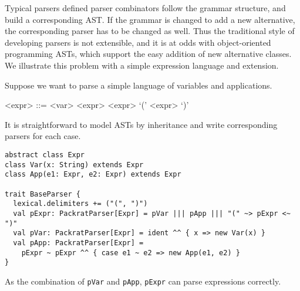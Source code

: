 
Typical parsers defined parser combinators follow the grammar
structure, and build a corresponding AST. If the grammar is changed to
add a new alternative, the corresponding parser has to be changed as
well. Thus the traditional style of developing parsers is not
extensible, and it is at odds with object-oriented programming ASTs,
which support the easy addition of new alternative classes. We
illustrate this problem with a simple expression language and extension.

Suppose we want to parse a simple language of variables and
applications.

\setlength{\grammarindent}{5em}
\begin{grammar}
<expr> ::= <var>
    \alt <expr> <expr>
    \alt `(' <expr> `)'
\end{grammar}

It is straightforward to model ASTs by inheritance and write corresponding parsers for each case. 

\begin{lstlisting}
abstract class Expr
class Var(x: String) extends Expr
class App(e1: Expr, e2: Expr) extends Expr

trait BaseParser {
  lexical.delimiters += ("(", ")")
  val pExpr: PackratParser[Expr] = pVar ||| pApp ||| "(" ~> pExpr <~ ")"
  val pVar: PackratParser[Expr] = ident ^^ { x => new Var(x) }
  val pApp: PackratParser[Expr] =
    pExpr ~ pExpr ^^ { case e1 ~ e2 => new App(e1, e2) }
}
\end{lstlisting}

As the combination of \lstinline{pVar} and \lstinline{pApp}, \lstinline{pExpr} can parse expressions correctly.

